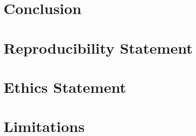 \section{Conclusion}\label{sec:conclusion}

\section{Reproducibility Statement}\label{sec:reproducibility}

\section{Ethics Statement}\label{sec:ethics}

\section{Limitations}\label{sec:limitations}
